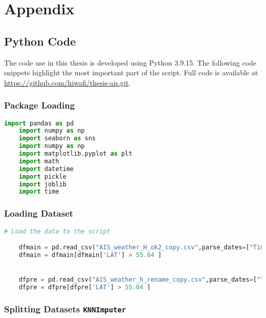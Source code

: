 \chapter*{Appendix}


\section*{Python Code}

The code use in this thesis is developed using Python 3.9.15. The following code snippets highlight the most important part of the script. Full code is available at \url{https://github.com/hiwafi/thesis-ais.git}.

\subsection*{Package Loading}

\begin{lstlisting}[language=Python]
    import pandas as pd
    import numpy as np
    import seaborn as sns
    import numpy as np
    import matplotlib.pyplot as plt
    import math
    import datetime
    import pickle
    import joblib
    import time 
\end{lstlisting}

\subsection*{Loading Dataset}

\begin{lstlisting}[language=Python]
    # Load the data to the script

    dfmain = pd.read_csv("AIS_weather_H_ok2_copy.csv",parse_dates=["Time"])
    dfmain = dfmain[dfmain['LAT'] > 55.04 ]


    dfpre = pd.read_csv("AIS_weather_h_rename_copy.csv",parse_dates=["Time"])
    dfpre = dfpre[dfpre['LAT'] > 55.04 ]

\end{lstlisting}

\subsection*{Splitting Datasets \texttt{KNNImputer}}

